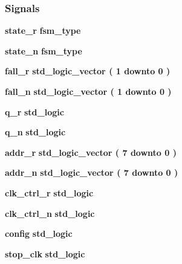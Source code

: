 \subsubsection*{Signals}
 \begin{DoxyCompactItemize}
\item 
{\bf state\+\_\+r} {\bfseries {\bfseries {\bf fsm\+\_\+type}} \textcolor{vhdlchar}{ }} 
\item 
{\bf state\+\_\+n} {\bfseries {\bfseries {\bf fsm\+\_\+type}} \textcolor{vhdlchar}{ }} 
\item 
{\bf fall\+\_\+r} {\bfseries \textcolor{comment}{std\+\_\+logic\+\_\+vector}\textcolor{vhdlchar}{ }\textcolor{vhdlchar}{(}\textcolor{vhdlchar}{ }\textcolor{vhdlchar}{ } \textcolor{vhdldigit}{1} \textcolor{vhdlchar}{ }\textcolor{keywordflow}{downto}\textcolor{vhdlchar}{ }\textcolor{vhdlchar}{ } \textcolor{vhdldigit}{0} \textcolor{vhdlchar}{ }\textcolor{vhdlchar}{)}\textcolor{vhdlchar}{ }} 
\item 
{\bf fall\+\_\+n} {\bfseries \textcolor{comment}{std\+\_\+logic\+\_\+vector}\textcolor{vhdlchar}{ }\textcolor{vhdlchar}{(}\textcolor{vhdlchar}{ }\textcolor{vhdlchar}{ } \textcolor{vhdldigit}{1} \textcolor{vhdlchar}{ }\textcolor{keywordflow}{downto}\textcolor{vhdlchar}{ }\textcolor{vhdlchar}{ } \textcolor{vhdldigit}{0} \textcolor{vhdlchar}{ }\textcolor{vhdlchar}{)}\textcolor{vhdlchar}{ }} 
\item 
{\bf q\+\_\+r} {\bfseries \textcolor{comment}{std\+\_\+logic}\textcolor{vhdlchar}{ }} 
\item 
{\bf q\+\_\+n} {\bfseries \textcolor{comment}{std\+\_\+logic}\textcolor{vhdlchar}{ }} 
\item 
{\bf addr\+\_\+r} {\bfseries \textcolor{comment}{std\+\_\+logic\+\_\+vector}\textcolor{vhdlchar}{ }\textcolor{vhdlchar}{(}\textcolor{vhdlchar}{ }\textcolor{vhdlchar}{ } \textcolor{vhdldigit}{7} \textcolor{vhdlchar}{ }\textcolor{keywordflow}{downto}\textcolor{vhdlchar}{ }\textcolor{vhdlchar}{ } \textcolor{vhdldigit}{0} \textcolor{vhdlchar}{ }\textcolor{vhdlchar}{)}\textcolor{vhdlchar}{ }} 
\item 
{\bf addr\+\_\+n} {\bfseries \textcolor{comment}{std\+\_\+logic\+\_\+vector}\textcolor{vhdlchar}{ }\textcolor{vhdlchar}{(}\textcolor{vhdlchar}{ }\textcolor{vhdlchar}{ } \textcolor{vhdldigit}{7} \textcolor{vhdlchar}{ }\textcolor{keywordflow}{downto}\textcolor{vhdlchar}{ }\textcolor{vhdlchar}{ } \textcolor{vhdldigit}{0} \textcolor{vhdlchar}{ }\textcolor{vhdlchar}{)}\textcolor{vhdlchar}{ }} 
\item 
{\bf clk\+\_\+ctrl\+\_\+r} {\bfseries \textcolor{comment}{std\+\_\+logic}\textcolor{vhdlchar}{ }} 
\item 
{\bf clk\+\_\+ctrl\+\_\+n} {\bfseries \textcolor{comment}{std\+\_\+logic}\textcolor{vhdlchar}{ }} 
\item 
{\bf config} {\bfseries \textcolor{comment}{std\+\_\+logic}\textcolor{vhdlchar}{ }} 
\item 
{\bf stop\+\_\+clk} {\bfseries \textcolor{comment}{std\+\_\+logic}\textcolor{vhdlchar}{ }} 
\end{DoxyCompactItemize}


